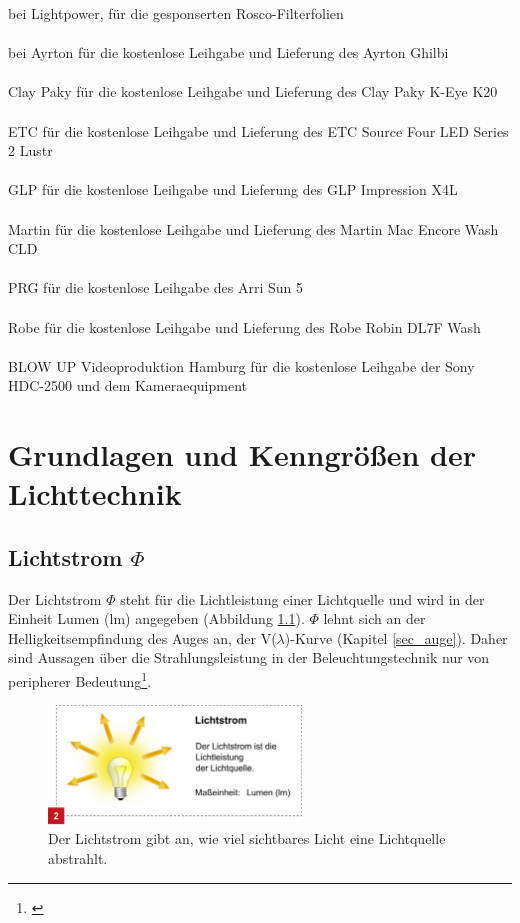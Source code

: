 \noindent bei Lightpower, für die gesponserten Rosco-Filterfolien\\\\
bei Ayrton für die kostenlose Leihgabe und Lieferung des  Ayrton Ghilbi\\\\
Clay Paky für die kostenlose Leihgabe und Lieferung des Clay Paky K-Eye K20\\\\
ETC für die kostenlose Leihgabe und Lieferung des ETC Source Four LED Series 2 Lustr\\\\
GLP für die kostenlose Leihgabe und Lieferung des GLP Impression X4L\\\\
Martin für die kostenlose Leihgabe und Lieferung des Martin Mac Encore Wash CLD\\\\
PRG für die kostenlose Leihgabe des Arri Sun 5\\\\
Robe für die kostenlose Leihgabe und Lieferung des Robe Robin DL7F Wash\\\\
BLOW UP Videoproduktion Hamburg für die kostenlose Leihgabe der Sony HDC-2500 und dem Kameraequipment

\newpage
\chapter{Grundlagen und Kenngrößen der Lichttechnik} \label{chap_grundlagen}

\section{Lichtstrom $\Phi$} \label{sec_lumen}
Der Lichtstrom $\Phi$ steht für die Lichtleistung einer Lichtquelle und wird in der Einheit Lumen (lm) angegeben (Abbildung \ref{b_lumen}). $\Phi$ lehnt sich an der Helligkeitsempfindung des Auges an, der V($\lambda$)-Kurve (Kapitel \ref{sec_auge}). Daher sind Aussagen über die Strahlungsleistung in der Beleuchtungstechnik nur von peripherer Bedeutung\footnote{\cite[23]{ris}}.

\begin{figure}[H]     %
\centering
\includegraphics[width=0.6\textwidth]{bilder/lumen} 
\caption {Der Lichtstrom gibt an, wie viel sichtbares Licht eine Lichtquelle abstrahlt\protect\footnotemark.}\label{b_lumen}
\end{figure}

